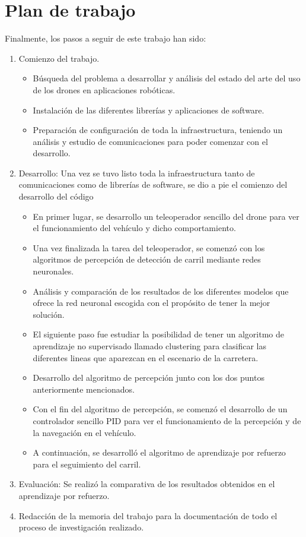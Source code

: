 \section{Plan de trabajo}
\label{sec:plantrabajo}

Finalmente, los pasos a seguir de este trabajo han sido: 
\begin{enumerate}
    \item Comienzo del trabajo. 
    \begin{itemize}
        \item Búsqueda del problema a desarrollar y análisis del estado del arte del uso de los drones en aplicaciones robóticas.
        \item Instalación de las diferentes librerías y aplicaciones de software. 
        \item Preparación de configuración de toda la infraestructura, teniendo un análisis y estudio de comunicaciones para poder comenzar con el desarrollo. 
    \end{itemize}
    \item Desarrollo: Una vez se tuvo listo toda la infraestructura tanto de comunicaciones como de librerías de software, se dio a pie el comienzo del desarrollo del código
        \begin{itemize}
            \item En primer lugar, se desarrollo un teleoperador sencillo del drone para ver el funcionamiento del vehículo y dicho comportamiento.
            \item Una vez finalizada la tarea del teleoperador, se comenzó con los algoritmos de percepción de detección de carril mediante redes neuronales.
            \item Análisis y comparación de los resultados de los diferentes modelos que ofrece la red neuronal escogida con el propósito de tener la mejor solución. 
            \item El siguiente paso fue estudiar la posibilidad de tener un algoritmo de aprendizaje no supervisado llamado clustering para clasificar las diferentes lineas que aparezcan en el escenario de la carretera.
            \item Desarrollo del algoritmo de percepción junto con los dos puntos anteriormente mencionados.
            \item Con el fin del algoritmo de percepción, se comenzó el desarrollo de un controlador sencillo PID para ver el funcionamiento de la percepción y de la navegación en el vehículo. 
            \item A continuación, se desarrolló el algoritmo de aprendizaje por refuerzo para el seguimiento del carril.
        \end{itemize}
    \item Evaluación: Se realizó la comparativa de los resultados obtenidos en el aprendizaje por refuerzo.
        
    \item Redacción de la memoria del trabajo para la documentación de todo el proceso de investigación realizado. 
\end{enumerate}


